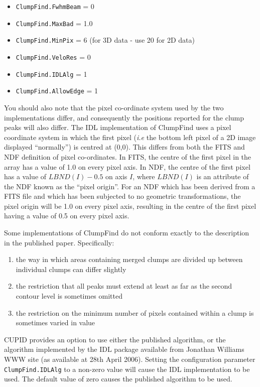 \documentclass[twoside,11pt]{article}
\renewcommand{\_}{\texttt{\symbol{95}}}
\begin{document}
\begin{itemize}
\item {\tt ClumpFind.FwhmBeam} = 0
\item {\tt ClumpFind.MaxBad} = 1.0
\item {\tt ClumpFind.MinPix} = 6 (for 3D data - use 20 for 2D data)
\item {\tt ClumpFind.VeloRes} = 0
\item {\tt ClumpFind.IDLAlg} = 1
\item {\tt ClumpFind.AllowEdge} = 1
\end{itemize}

You should also note that the pixel co-ordinate system used by the two
implementations differ, and consequently the positions reported for the
clump peaks will also differ. The IDL implementation of ClumpFind uses a
pixel coordinate system in which the first pixel (\emph{i.e} the bottom
left pixel of a 2D image displayed ``normally'') is centred at (0,0).
This differs from both the FITS and NDF definition of pixel co-ordinates.
In FITS, the centre of the first pixel in the array has a value of 1.0 on
every pixel axis. In NDF, the centre of the first pixel has a value of
$LBND(I) - 0.5$ on axis $I$, where $LBND(I)$ is an attribute of the NDF
known as the ``pixel origin''. For an NDF which has been derived from a
FITS file and which has been subjected to no geometric transformations,
the pixel origin will be 1.0 on every pixel axis, resulting in the centre
of the first pixel having a value of 0.5 on every pixel axis.

Some implementations of ClumpFind do not conform exactly to the description
in the published paper. Specifically:

\begin{enumerate}

\item the way in which areas containing merged clumps are divided up between
individual clumps can differ slightly

\item the restriction that all peaks must extend at least as far as the
second contour level is sometimes omitted

\item the restriction on the minimum number of pixels contained within a
clump is sometimes varied in value

\end{enumerate}

CUPID provides an option to use either the published algorithm, or the
algorithm implemented by the IDL package available from Jonathan Williams
WWW site (as available at 28th April 2006). Setting the configuration
parameter {\tt ClumpFind.IDLAlg} to a non-zero value will cause the IDL
implementation to be used. The default value of zero causes the published
algorithm to be used.
\end{document}
